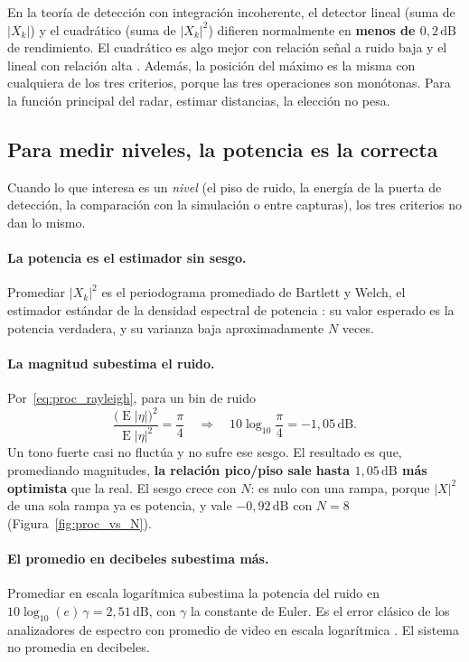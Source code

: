 En la teoría de detección con integración incoherente, el detector lineal
(suma de $\lvert X_k\rvert$) y el cuadrático (suma de $\lvert X_k\rvert^2$)
difieren normalmente en \textbf{menos de $0{,}2\,\text{dB}$} de
rendimiento. El cuadrático es algo mejor con relación señal a ruido baja y
el lineal con relación alta \cite{Richards2014, Skolnik2001}. Además, la
posición del máximo es la misma con cualquiera de los tres criterios, porque
las tres operaciones son monótonas. Para la función principal del radar,
estimar distancias, la elección no pesa.

\subsection{Para medir niveles, la potencia es la correcta}

Cuando lo que interesa es un \emph{nivel} (el piso de ruido, la energía de
la puerta de detección, la comparación con la simulación o entre capturas),
los tres criterios no dan lo mismo.

\paragraph{La potencia es el estimador sin sesgo.}
Promediar $\lvert X_k\rvert^2$ es el periodograma promediado de Bartlett y
Welch, el estimador estándar de la densidad espectral de potencia
\cite{Welch1967, Proakis2006}: su valor esperado es la potencia verdadera, y
su varianza baja aproximadamente $N$ veces.

\paragraph{La magnitud subestima el ruido.}
Por~\eqref{eq:proc_rayleigh}, para un bin de ruido
\begin{equation}
  \frac{\bigl(\operatorname{E}\lvert\eta\rvert\bigr)^2}
       {\operatorname{E}\lvert\eta\rvert^2} = \frac{\pi}{4}
  \quad\Longrightarrow\quad
  10\log_{10}\frac{\pi}{4} = -1{,}05\,\text{dB}.
  \label{eq:proc_sesgo_mag}
\end{equation}
Un tono fuerte casi no fluctúa y no sufre ese sesgo. El resultado es que,
promediando magnitudes, \textbf{la relación pico/piso sale hasta
$1{,}05\,\text{dB}$ más optimista} que la real. El sesgo crece con $N$: es
nulo con una rampa, porque $\lvert X\rvert^2$ de una sola rampa ya es
potencia, y vale $-0{,}92\,\text{dB}$ con $N = 8$
(Figura~\ref{fig:proc_vs_N}).

\paragraph{El promedio en decibeles subestima más.}
Promediar en escala logarítmica subestima la potencia del ruido en
$10\log_{10}(e)\,\gamma = 2{,}51\,\text{dB}$, con $\gamma$ la constante de
Euler. Es el error clásico de los analizadores de espectro con promedio de
video en escala logarítmica \cite{KeysightAN150}. El sistema no promedia en
decibeles.

